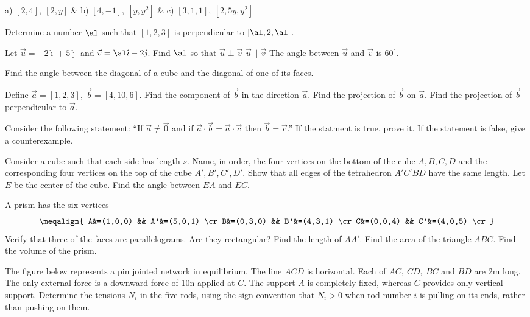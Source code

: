 {{\columns
\+
a) $[2,4],\ [2,y]$ &
b) $[4,-1],\ [y,y^2]$ &
c) $[3,1,1],\ [2,5y,y^2]$ \cr
}
\medskip
\item{\next} Determine a number $\al$ such that $[1,2,3]$ is perpendicular
to $[\al,2,\al]$.
\medskip
\item{\next} Let $\vec u=-2\hat\imath+5\hat\jmath$ and $\vec v=\al\hat\imath
-2\hat\jmath$. Find $\al$ so that
 $\vec u\perp\vec v$
 $\vec u \| \vec v$
 The angle between $\vec u$ and $\vec v$ is $60^\circ$.
\medskip
\item{\next} Find the angle between the diagonal of a cube and the diagonal
of one of its faces.
\medskip
\item{\next} Define $\vec a=[1,2,3],\ \vec b=[4,10,6]$.
 Find the component of $\vec b$ in the direction $\vec a$.
 Find the projection of $\vec b$ on $\vec a$.
 Find the projection of $\vec b$ perpendicular to $\vec a$.
\medskip
\item{\next} Consider the following statement: ``If $\vec a\ne\vec 0$
and if $\vec a\cdot\vec b=\vec a\cdot\vec c$ then $\vec b=\vec c$.''
If the statment is true, prove it. If the statement is false, give a 
counterexample.
\medskip
\item{\next} Consider a cube such that each side has length $s$. Name,
in order, the four vertices on the bottom of the cube $A, B, C, D$ and the
corresponding four vertices on the top of the cube $A', B', C', D'$.
 Show that all edges of the tetrahedron $A'C'BD$ have the
same length.
 Let $E$ be the center of the cube. Find the angle between
$EA$ and $EC$.
\medskip
\item{\next} 
A prism has the six vertices
$$\meqalign{
A&=(1,0,0)   &&  A'&=(5,0,1) \cr
B&=(0,3,0)   &&  B'&=(4,3,1) \cr
C&=(0,0,4)   &&  C'&=(4,0,5) \cr
}$$
 Verify that three of the faces are parallelograms.
Are they rectangular?
 Find the length of $AA'$.
 Find the area of the triangle $ABC$.
 Find the volume of the prism.
\medskip
\item{\next}The figure below represents a pin jointed network in equilibrium.
 The line
$ACD$ is horizontal. Each of $AC,\ CD,\ BC$ and $BD$ are 2m long. The only
external force is a downward force of 10n applied at $C$. The support
$A$ is completely fixed, whereas $C$ provides only vertical support.
Determine the tensions $N_i$ in the five rods, using the sign convention
that $N_i>0$ when rod number $i$ is pulling on its ends, rather than pushing on them.


}
